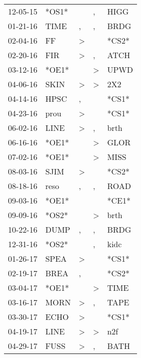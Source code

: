 \begin{supertabular}{lllll}
 12-05-15 &  *OS1* &                  &                , &   HIGG \\
 01-21-16 &   TIME &                , &                , &   BRDG \\
 02-04-16 &     FF &     \textgreater &                  &  *CS2* \\
 02-20-16 &    FIR &     \textgreater &                , &   ATCH \\
 03-12-16 &  *OE1* &                  &     \textgreater &   UPWD \\
 04-06-16 &   SKIN &     \textgreater &     \textgreater &    2X2 \\
 04-14-16 &   HPSC &                , &                  &  *CS1* \\
 04-23-16 &   prou &     \textgreater &                  &  *CS1* \\
 06-02-16 &   LINE &     \textgreater &                , &   brth \\
 06-16-16 &  *OE1* &                  &     \textgreater &   GLOR \\
 07-02-16 &  *OE1* &                  &     \textgreater &   MISS \\
 08-03-16 &   SJIM &     \textgreater &                  &  *CS2* \\
 08-18-16 &   reso &                , &                , &   ROAD \\
 09-03-16 &  *OE1* &                  &                  &  *CE1* \\
 09-09-16 &  *OS2* &                  &     \textgreater &   brth \\
 10-22-16 &   DUMP &                , &                , &   BRDG \\
 12-31-16 &  *OS2* &                  &                , &   kidc \\
 01-26-17 &   SPEA &     \textgreater &                  &  *CS1* \\
 02-19-17 &   BREA &                , &                  &  *CS2* \\
 03-04-17 &  *OE1* &                  &     \textgreater &   TIME \\
 03-16-17 &   MORN &     \textgreater &                , &   TAPE \\
 03-30-17 &   ECHO &     \textgreater &                  &  *CS1* \\
 04-19-17 &   LINE &     \textgreater &     \textgreater &    n2f \\
 04-29-17 &   FUSS &     \textgreater &                , &   BATH \\

\end{supertabular}
